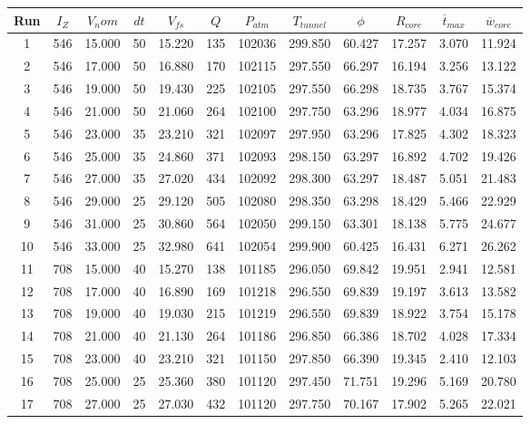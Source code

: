 \begin{table}[H]
\begin{center}
\begin{tabular}{|cccccccccccc|}
	\hline
	Run & $I_Z$ & $V_nom$ & $dt$ & $V_{fs}$ & $Q$ & $P_{atm}$ & $T_{tunnel}$ & $\phi$ & $R_{core}$ & $\overline{t}_{max}$ & $\overline{w}_{core}$\\
	\hline
	1 & 546 & 15.000 & 50 & 15.220 & 135 & 102036 & 299.850 & 60.427 & 17.257 & 3.070 & 11.924\\
	2 & 546 & 17.000 & 50 & 16.880 & 170 & 102115 & 297.550 & 66.297 & 16.194 & 3.256 & 13.122\\
	3 & 546 & 19.000 & 50 & 19.430 & 225 & 102105 & 297.550 & 66.298 & 18.735 & 3.767 & 15.374\\
	4 & 546 & 21.000 & 50 & 21.060 & 264 & 102100 & 297.750 & 63.296 & 18.977 & 4.034 & 16.875\\
	5 & 546 & 23.000 & 35 & 23.210 & 321 & 102097 & 297.950 & 63.296 & 17.825 & 4.302 & 18.323\\
	6 & 546 & 25.000 & 35 & 24.860 & 371 & 102093 & 298.150 & 63.297 & 16.892 & 4.702 & 19.426\\
	7 & 546 & 27.000 & 35 & 27.020 & 434 & 102092 & 298.300 & 63.297 & 18.487 & 5.051 & 21.483\\
	8 & 546 & 29.000 & 25 & 29.120 & 505 & 102080 & 298.350 & 63.298 & 18.429 & 5.466 & 22.929\\
	9 & 546 & 31.000 & 25 & 30.860 & 564 & 102050 & 299.150 & 63.301 & 18.138 & 5.775 & 24.677\\
	10 & 546 & 33.000 & 25 & 32.980 & 641 & 102054 & 299.900 & 60.425 & 16.431 & 6.271 & 26.262\\
	11 & 708 & 15.000 & 40 & 15.270 & 138 & 101185 & 296.050 & 69.842 & 19.951 & 2.941 & 12.581\\
	12 & 708 & 17.000 & 40 & 16.890 & 169 & 101218 & 296.550 & 69.839 & 19.197 & 3.613 & 13.582\\
	13 & 708 & 19.000 & 40 & 19.030 & 215 & 101219 & 296.550 & 69.839 & 18.922 & 3.754 & 15.178\\
	14 & 708 & 21.000 & 40 & 21.130 & 264 & 101186 & 296.850 & 66.386 & 18.702 & 4.028 & 17.334\\
	15 & 708 & 23.000 & 40 & 23.210 & 321 & 101150 & 297.850 & 66.390 & 19.345 & 2.410 & 12.103\\
	16 & 708 & 25.000 & 25 & 25.360 & 380 & 101120 & 297.450 & 71.751 & 19.296 & 5.169 & 20.780\\
	17 & 708 & 27.000 & 25 & 27.030 & 432 & 101120 & 297.750 & 70.167 & 17.902 & 5.265 & 22.021\\

\end{tabular}
\end{center}
\end{table}
